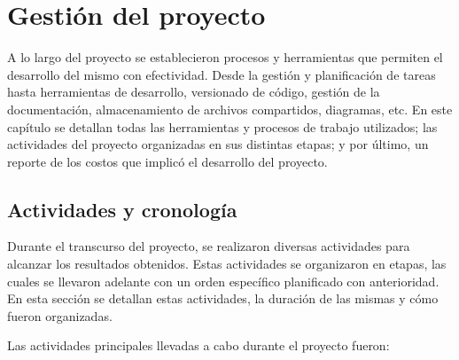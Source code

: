 \chapter{Gestión del proyecto}\label{chap:project_management}

A lo largo del proyecto se establecieron procesos y herramientas que permiten el desarrollo del mismo con efectividad. Desde la gestión y planificación de tareas hasta herramientas de desarrollo, versionado de código, gestión de la documentación, almacenamiento de archivos compartidos, diagramas, etc. En este capítulo se detallan todas las herramientas y procesos de trabajo utilizados; las actividades del proyecto organizadas en sus distintas etapas; y por último, un reporte de los costos que implicó el desarrollo del proyecto. 

\section{Actividades y cronología}\label{section:project-activites}

Durante el transcurso del proyecto, se realizaron diversas actividades para alcanzar los resultados obtenidos. Estas actividades se organizaron en etapas, las cuales se llevaron adelante con un orden específico planificado con anterioridad. En esta sección se detallan estas actividades, la duración de las mismas y cómo fueron organizadas. 

Las actividades principales llevadas a cabo durante el proyecto fueron: 

